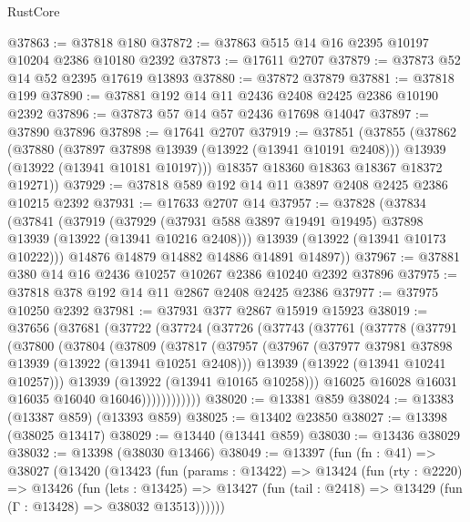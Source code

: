 \begin{lexlean}{RustCore}
\begin{coremodule}
@37863 := @37818 @180
@37872 := @37863 @515 @14 @16 @2395 @10197 @10204 @2386 @10180 @2392
@37873 := @17611 @2707
@37879 := @37873 @52 @14 @52 @2395 @17619 @13893
@37880 := @37872 @37879
@37881 := @37818 @199
@37890 := @37881 @192 @14 @11 @2436 @2408 @2425 @2386 @10190 @2392
@37896 := @37873 @57 @14 @57 @2436 @17698 @14047
@37897 := @37890 @37896
@37898 := @17641 @2707
@37919 := @37851
    (@37855
      (@37862
        (@37880
          (@37897 @37898 @13939 (@13922 (@13941 @10191 @2408)))
          @13939
          (@13922 (@13941 @10181 @10197)))
        @18357
        @18360
        @18363
        @18367
        @18372
        @19271))
@37929 := @37818 @589 @192 @14 @11 @3897 @2408 @2425 @2386 @10215 @2392
@37931 := @17633 @2707 @14
@37957 := @37828
    (@37834
      (@37841
        (@37919
          (@37929 (@37931 @588 @3897 @19491 @19495) @37898 @13939 (@13922 (@13941 @10216 @2408)))
          @13939
          (@13922 (@13941 @10173 @10222)))
        @14876
        @14879
        @14882
        @14886
        @14891
        @14897))
@37967 := @37881 @380 @14 @16 @2436 @10257 @10267 @2386 @10240 @2392 @37896
@37975 := @37818 @378 @192 @14 @11 @2867 @2408 @2425 @2386
@37977 := @37975 @10250 @2392
@37981 := @37931 @377 @2867 @15919 @15923
@38019 := @37656
    (@37681
      (@37722
        (@37724
          (@37726
            (@37743
              (@37761
                (@37778
                  (@37791
                    (@37800
                      (@37804
                        (@37809
                          (@37817
                            (@37957
                              (@37967
                                (@37977 @37981 @37898 @13939 (@13922 (@13941 @10251 @2408)))
                                @13939
                                (@13922 (@13941 @10241 @10257)))
                              @13939
                              (@13922 (@13941 @10165 @10258)))
                            @16025
                            @16028
                            @16031
                            @16035
                            @16040
                            @16046))))))))))))
@38020 := @13381 @859
@38024 := @13383 (@13387 @859) (@13393 @859)
@38025 := @13402 @23850
@38027 := @13398 (@38025 @13417)
@38029 := @13440 (@13441 @859)
@38030 := @13436 @38029
@38032 := @13398 (@38030 @13466)
@38049 := @13397
    (fun (fn : @41) =>
    @38027
      (@13420
        (@13423
          (fun (params : @13422) =>
          @13424
            (fun (rty : @2220) =>
            @13426
              (fun (lets : @13425) =>
              @13427 (fun (tail : @2418) => @13429 (fun (Γ : @13428) => @38032 @13513))))))

\end{coremodule}
\end{lexlean}
